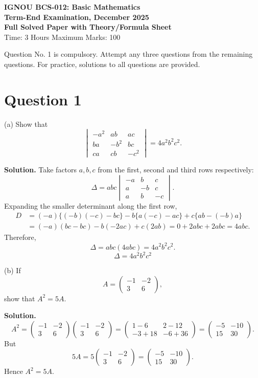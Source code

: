 \documentclass[11pt,a4paper]{article}
\newcommand{\question}[1]{\vspace{0.4em}\begin{tcolorbox}[colback=gray!8,colframe=black!55,title=Question,fonttitle=\bfseries]#1\end{tcolorbox}}
\newcommand{\answer}{\textbf{Solution. }}
\newcommand{\final}[1]{\[\boxed{#1}\]}
\begin{document}
\begin{center}
{\Large\bfseries IGNOU BCS-012: Basic Mathematics}\\[2mm]
{\large\bfseries Term-End Examination, December 2025}\\[1mm]
{\bfseries Full Solved Paper with Theory/Formula Sheet}\\[2mm]
Time: 3 Hours \quad Maximum Marks: 100
\end{center}

\begin{tcolorbox}[colback=blue!4,colframe=blue!45,title=Note]
Question No. 1 is compulsory. Attempt any three questions from the remaining questions. For practice, solutions to all questions are provided.
\end{tcolorbox}

\section*{Question 1}

\question{(a) Show that
\[
\begin{vmatrix}
-a^2 & ab & ac\\
ba & -b^2 & bc\\
ca & cb & -c^2
\end{vmatrix}=4a^2b^2c^2.
\]}
\answer
Take factors $a,b,c$ from the first, second and third rows respectively:
\[
\Delta=abc\begin{vmatrix}-a&b&c\\ a&-b&c\\ a&b&-c\end{vmatrix}.
\]
Expanding the smaller determinant along the first row,
\[
\begin{aligned}
D&=(-a)\{(-b)(-c)-bc\}-b\{a(-c)-ac\}+c\{ab-(-b)a\}\\
&=(-a)(bc-bc)-b(-2ac)+c(2ab)=0+2abc+2abc=4abc.
\end{aligned}
\]
Therefore,
\[
\Delta=abc(4abc)=4a^2b^2c^2.
\]
\final{\Delta=4a^2b^2c^2}

\question{(b) If
\[
A=\begin{pmatrix}-1&-2\\3&6\end{pmatrix},
\]
show that $A^2=5A$.}
\answer
\[
A^2=\begin{pmatrix}-1&-2\\3&6\end{pmatrix}
\begin{pmatrix}-1&-2\\3&6\end{pmatrix}
=\begin{pmatrix}1-6&2-12\\-3+18&-6+36\end{pmatrix}
=\begin{pmatrix}-5&-10\\15&30\end{pmatrix}.
\]
But
\[
5A=5\begin{pmatrix}-1&-2\\3&6\end{pmatrix}
=\begin{pmatrix}-5&-10\\15&30\end{pmatrix}.
\]
Hence $A^2=5A$.
\end{document}
